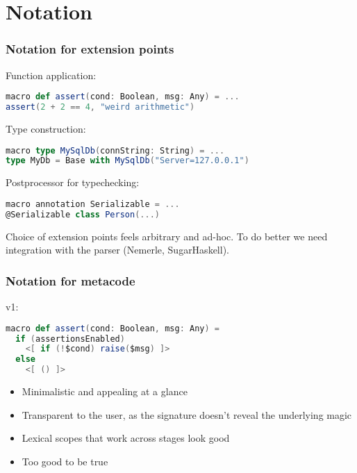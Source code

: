 \documentclass[hyperref={bookmarks=false}]{beamer}
\begin{document}
\section{Notation}

\begin{frame}[fragile]
\frametitle{Notation for extension points}

Function application:
\begin{lstlisting}[language=scala]
macro def assert(cond: Boolean, msg: Any) = ...
assert(2 + 2 == 4, "weird arithmetic")
\end{lstlisting}

Type construction:
\begin{lstlisting}[language=scala]
macro type MySqlDb(connString: String) = ...
type MyDb = Base with MySqlDb("Server=127.0.0.1")
\end{lstlisting}

Postprocessor for typechecking:
\begin{lstlisting}[language=scala]
macro annotation Serializable = ...
@Serializable class Person(...)
\end{lstlisting}

Choice of extension points feels arbitrary and ad-hoc. To do better we need integration with the parser (Nemerle, SugarHaskell).
\end{frame}

\begin{frame}[fragile]
\frametitle{Notation for metacode}
v1:
\begin{lstlisting}[language=scala]
macro def assert(cond: Boolean, msg: Any) =
  if (assertionsEnabled)
    <[ if (!$cond) raise($msg) ]>
  else
    <[ () ]>
\end{lstlisting}

\begin{itemize}
\item Minimalistic and appealing at a glance
\item Transparent to the user, as the signature doesn't reveal the underlying magic
\item Lexical scopes that work across stages look good
\item Too good to be true
\end{itemize}
\end{frame}
\end{document}
